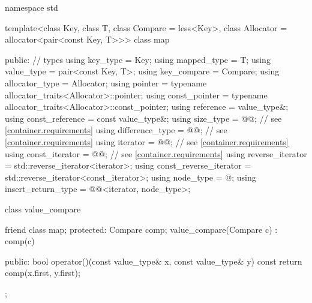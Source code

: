 %
%
\begin{codeblock}
namespace std {
  template<class Key, class T, class Compare = less<Key>,
           class Allocator = allocator<pair<const Key, T>>>
  class map {
  public:
    // types
    using key_type               = Key;
    using mapped_type            = T;
    using value_type             = pair<const Key, T>;
    using key_compare            = Compare;
    using allocator_type         = Allocator;
    using pointer                = typename allocator_traits<Allocator>::pointer;
    using const_pointer          = typename allocator_traits<Allocator>::const_pointer;
    using reference              = value_type&;
    using const_reference        = const value_type&;
    using size_type              = @@; // see \ref{container.requirements}
    using difference_type        = @@; // see \ref{container.requirements}
    using iterator               = @@; // see \ref{container.requirements}
    using const_iterator         = @@; // see \ref{container.requirements}
    using reverse_iterator       = std::reverse_iterator<iterator>;
    using const_reverse_iterator = std::reverse_iterator<const_iterator>;
    using node_type              = @\unspec@;
    using insert_return_type     = @@<iterator, node_type>;

    class value_compare {
      friend class map;
    protected:
      Compare comp;
      value_compare(Compare c) : comp(c) {}

    public:
      bool operator()(const value_type& x, const value_type& y) const {
        return comp(x.first, y.first);
      }
    };

}}
\end{codeblock}
